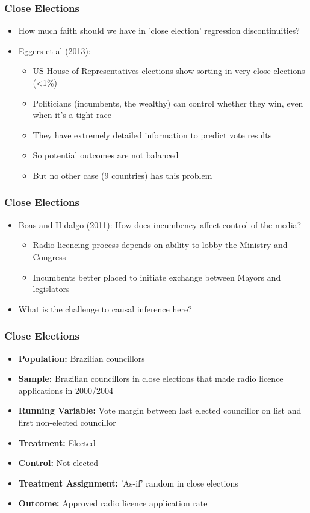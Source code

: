 \documentclass[xcolor=x11names,compress]{beamer}\usepackage[]{graphicx}\usepackage[]{color}
\renewcommand{\(}{\begin{columns}}
\renewcommand{\)}{\end{columns}}
\newcommand{\<}[1]{\begin{column}{#1}}
\renewcommand{\>}{\end{column}}
\begin{document}
\begin{frame}
\frametitle{Close Elections}
\begin{itemize}
\item How much faith should we have in 'close election' regression discontinuities?
\pause
\item Eggers et al (2013):
\pause
\begin{itemize}
\item US House of Representatives elections show sorting in very close elections (<1\%)
\pause
\item Politicians (incumbents, the wealthy) can control whether they win, even when it's a tight race
\pause
\item They have extremely detailed information to predict vote results
\pause
\item So potential outcomes are not balanced
\pause
\item But no other case (9 countries) has this problem
\end{itemize}
\end{itemize}
\end{frame}

\begin{frame}
\frametitle{Close Elections}
\begin{itemize}
\item Boas and Hidalgo (2011): How does incumbency affect control of the media?
\pause
\begin{itemize}
\item Radio licencing process depends on ability to lobby the Ministry and Congress
\pause
\item Incumbents better placed to initiate exchange between Mayors and legislators
\pause
\end{itemize}
\item What is the challenge to causal inference here?
\end{itemize}
\end{frame}

\begin{frame}
\frametitle{Close Elections}
\begin{itemize}
\item \textbf{Population:} Brazilian councillors
\pause
\item \textbf{Sample:} Brazilian councillors in close elections that made radio licence applications in 2000/2004
\pause
\item \textbf{Running Variable:} Vote margin between last elected councillor on list and first non-elected councillor
\pause
\item \textbf{Treatment:} Elected
\pause
\item \textbf{Control:} Not elected
\pause
\item \textbf{Treatment Assignment:} 'As-if' random in close elections
\pause
\item \textbf{Outcome:} Approved radio licence application rate
\end{itemize}
\end{frame}
\end{document}
